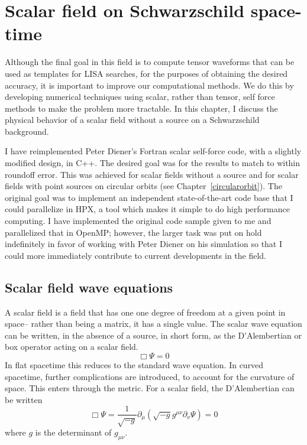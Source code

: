 \section{Scalar field on Schwarzschild space-time}
Although the final goal in this field is to compute tensor waveforms that can be used as templates for LISA searches, for the purposes of obtaining the desired accuracy, it is important to improve our computational methods. We do this by developing numerical techniques using scalar, rather than tensor, self force methods to make the problem more tractable. In this chapter, I discuss the physical behavior of a scalar field without a source on a Schwarzschild background.

I have reimplemented Peter Diener's Fortran scalar self-force code, with a slightly modified design, in C++. The desired goal was for the results to match to within roundoff error. This was achieved for scalar fields without a source and for scalar fields with point sources on circular orbits (see Chapter~\ref{circularorbit}). The original goal was to implement an independent state-of-the-art code base that I could parallelize in HPX, a tool which makes it simple to do high performance computing. I have implemented the original code sample given to me and parallelized that in OpenMP; however, the larger task was put on hold indefinitely in favor of working with Peter Diener on his simulation so that I could more immediately contribute to current developments in the field.




\subsection{Scalar field wave equations}
A scalar field is a field that has one one degree of freedom at a given point in space-- rather than being a matrix, it has a single value. The scalar wave equation can be written, in the absence of a source, in short form, as the D'Alembertian or box operator acting on a scalar field. 
\begin{equation}
  \Box\Psi=0
\end{equation}
In flat spacetime this reduces to the standard wave equation. In curved spacetime, further complications are introduced, to account for the curvature of space. This enters through the metric. For a scalar field, the D'Alembertian can be written
\begin{equation}
  \Box\Psi=\frac{1}{\sqrt{-g}}\partial_\mu(\sqrt{-g}g^{\mu\nu}\partial_\nu\Psi)=0
\end{equation}
where $g$ is the determinant of $g_{\mu\nu}$.~\cite{Wald} 


